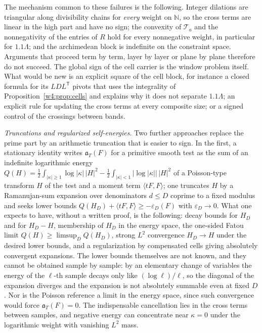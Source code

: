 \documentclass[11pt]{amsart}
\theoremstyle{definition}
\theoremstyle{remark}
\numberwithin{equation}{section}
\newcommand{\N}{\mathbb{N}}
\newcommand{\aT}{\mathfrak{a}_T}                       %
\begin{document}
The mechanism common to these failures is the following. Integer dilations are triangular along divisibility chains for
\emph{every} weight on $\N$, so the cross terms are linear in the high part and have no sign; the convexity of
$\mathcal T_a$ and the nonnegativity of the entries of $R$ hold for every nonnegative weight, in particular for
$1.1\Lambda$; and the archimedean block is indefinite on the constraint space. Arguments that proceed term by term, layer by layer or plane by plane therefore do not succeed. The global sign of the cell carrier is the window problem itself. What would be new is an explicit square of
the cell block, for instance a closed formula for its $LDL^{\mathsf T}$ pivots that uses the integrality of
Proposition~\ref{w4:prop:cells} and explains why it does not separate $1.1\Lambda$; an explicit rule for updating the
cross terms at every composite size; or a signed control of the crossings between bands.

\label{w4:fam:R5}%
\emph{Truncations and regularized self-energies.} Two further approaches replace the prime part by an arithmetic
truncation that is easier to sign. In the first, a stationary identity writes $\aT(F)$ for a primitive smooth test as
the sum of an indefinite logarithmic energy
$Q(H)=\frac12\int_{|\kappa|\ge1}\log|\kappa|\,|H|^2-\frac12\int_{|\kappa|<1}|\log|\kappa||\,|H|^2$ of a Poisson-type
transform $H$ of the test and a moment term $\langle tF,F\rangle$; one truncates $H$ by a Ramanujan-sum expansion over
denominators $d\le D$ coprime to a fixed modulus and seeks lower bounds
$Q(H_D)+\langle tF,F\rangle\ge-\varepsilon_D(F)$ with $\varepsilon_D\to0$. What one expects to have, without a written
proof, is the following: decay bounds for $H_D$ and for $H_D-H$, membership of $H_D$ in the energy space, the one-sided
Fatou limit $Q(H)\ge\limsup_DQ(H_D)$, strong $L^2$ convergence $H_D\to H$ under the desired lower bounds, and a
regularization by compensated cells giving absolutely convergent expansions. The lower bounds themselves are not
known, and they cannot be obtained sample by sample: by an elementary change of variables the energy of the $\ell$-th
sample decays only like $(\log\ell)/\ell$, so the diagonal of the expansion diverges and the expansion is not absolutely
summable even at fixed $D$. Nor is the Poisson reference a limit in the energy space, since such convergence would
force $\aT(F)=0$. The indispensable cancellation lies in the cross terms between samples, and negative energy can
concentrate near $\kappa=0$ under the logarithmic weight with vanishing $L^2$ mass.
\end{document}
